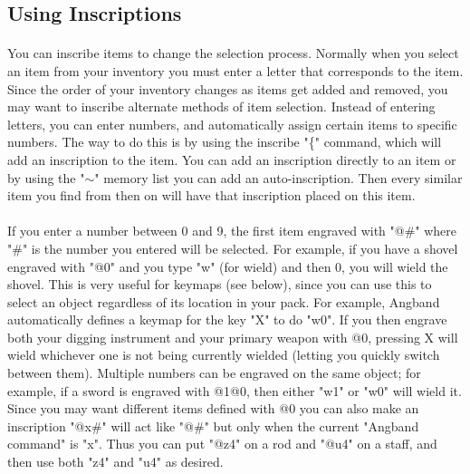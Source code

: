 \subsection{Using Inscriptions}
\paragraph{}You can inscribe items to change the selection process. Normally
when you select an item from your inventory you must enter a letter that
corresponds to the item. Since the order of your inventory changes as
items get added and removed, you may want to inscribe alternate methods of
item selection. Instead of entering letters, you can enter numbers, and
automatically assign certain items to specific numbers. The way to do this
is by using the inscribe "\{" command, which will add an inscription to the
item. You can add an inscription directly to an item or by using the "$\sim$"
memory list you can add an auto-inscription. Then every similar item you
find from then on will have that inscription placed on this item.

\paragraph{}If you enter a number between 0 and 9, the first item engraved
with "@\#" where "\#" is the number you entered will be selected. For example,
if you have a shovel engraved with "@0" and you type "w" (for wield) and
then 0, you will wield the shovel. This is very useful for keymaps (see
below), since you can use this to select an object regardless of its
location in your pack. For example, Angband automatically defines a keymap
for the key "X" to do "w0". If you then engrave both your digging
instrument and your primary weapon with @0, pressing X will wield
whichever one is not being currently wielded (letting you quickly switch
between them). Multiple numbers can be engraved on the same object; for
example, if a sword is engraved with @1@0, then either "w1" or "w0" will
wield it. Since you may want different items defined with @0 you can also
make an inscription "@x\#" will act like "@\#" but only when the current
"Angband command" is "x". Thus you can put "@z4" on a rod and "@u4" on a
staff, and then use both "z4" and "u4" as desired.


